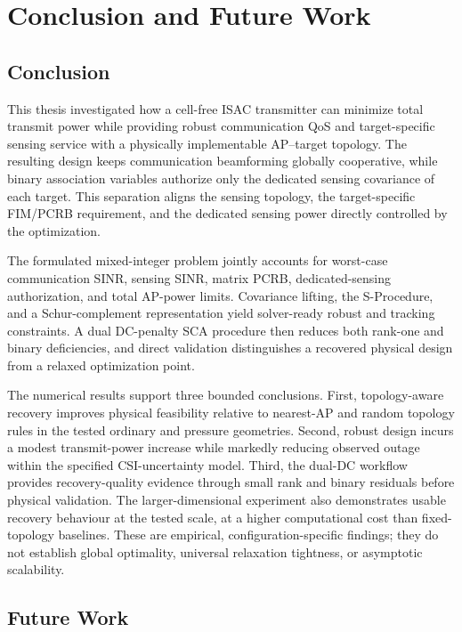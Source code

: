 \chapter{Conclusion and Future Work}\label{ch:future_work}

\section{Conclusion}

This thesis investigated how a cell-free ISAC transmitter can minimize total
transmit power while providing robust communication QoS and target-specific
sensing service with a physically implementable AP--target topology. The
resulting design keeps communication beamforming globally cooperative, while
binary association variables authorize only the dedicated sensing covariance
of each target. This separation aligns the sensing topology, the
target-specific FIM/PCRB requirement, and the dedicated sensing power directly
controlled by the optimization.

The formulated mixed-integer problem jointly accounts for worst-case
communication SINR, sensing SINR, matrix PCRB, dedicated-sensing
authorization, and total AP-power limits. Covariance lifting, the
S-Procedure, and a Schur-complement representation yield solver-ready robust
and tracking constraints. A dual DC-penalty SCA procedure then reduces both
rank-one and binary deficiencies, and direct validation distinguishes a
recovered physical design from a relaxed optimization point.

The numerical results support three bounded conclusions. First,
topology-aware recovery improves physical feasibility relative to nearest-AP
and random topology rules in the tested ordinary and pressure geometries.
Second, robust design incurs a modest transmit-power increase while markedly
reducing observed outage within the specified CSI-uncertainty model. Third,
the dual-DC workflow provides recovery-quality evidence through small rank and
binary residuals before physical validation. The larger-dimensional experiment
also demonstrates usable recovery behaviour at the tested scale, at a higher
computational cost than fixed-topology baselines. These are empirical,
configuration-specific findings; they do not establish global optimality,
universal relaxation tightness, or asymptotic scalability.

\section{Future Work}


